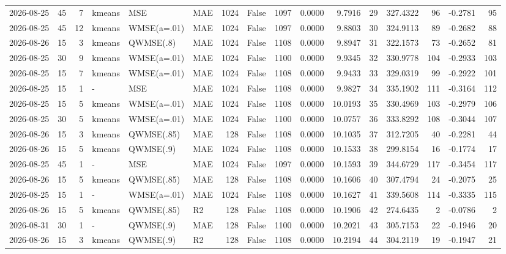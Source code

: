 \documentclass[10pt]{article}
\begin{document}
\begin{landscape}
\begin{longtable}{@{}lrrlllrcrrrrrrrr@{}}
2026-08-25 & 45 & 7 & kmeans & MSE & MAE & 1024 & False & 1097 & 0.0000 & 9.7916 & 29 & 327.4322 & 96 & -0.2781 & 95 \\
2026-08-25 & 45 & 12 & kmeans & WMSE(a=.01) & MAE & 1024 & False & 1097 & 0.0000 & 9.8803 & 30 & 324.9113 & 89 & -0.2682 & 88 \\
2026-08-26 & 15 & 3 & kmeans & QWMSE(.8) & MAE & 1024 & False & 1108 & 0.0000 & 9.8947 & 31 & 322.1573 & 73 & -0.2652 & 81 \\
2026-08-25 & 30 & 9 & kmeans & WMSE(a=.01) & MAE & 1024 & False & 1100 & 0.0000 & 9.9345 & 32 & 330.9778 & 104 & -0.2933 & 103 \\
2026-08-25 & 15 & 7 & kmeans & WMSE(a=.01) & MAE & 1024 & False & 1108 & 0.0000 & 9.9433 & 33 & 329.0319 & 99 & -0.2922 & 101 \\
2026-08-25 & 15 & 1 & - & MSE & MAE & 1024 & False & 1108 & 0.0000 & 9.9827 & 34 & 335.1902 & 111 & -0.3164 & 112 \\
2026-08-25 & 15 & 5 & kmeans & WMSE(a=.01) & MAE & 1024 & False & 1108 & 0.0000 & 10.0193 & 35 & 330.4969 & 103 & -0.2979 & 106 \\
2026-08-25 & 30 & 5 & kmeans & WMSE(a=.01) & MAE & 1024 & False & 1100 & 0.0000 & 10.0757 & 36 & 333.8292 & 108 & -0.3044 & 107 \\
2026-08-26 & 15 & 3 & kmeans & QWMSE(.85) & MAE & 128 & False & 1108 & 0.0000 & 10.1035 & 37 & 312.7205 & 40 & -0.2281 & 44 \\
2026-08-26 & 15 & 5 & kmeans & QWMSE(.9) & MAE & 1024 & False & 1108 & 0.0000 & 10.1533 & 38 & 299.8154 & 16 & -0.1774 & 17 \\
2026-08-25 & 45 & 1 & - & MSE & MAE & 1024 & False & 1097 & 0.0000 & 10.1593 & 39 & 344.6729 & 117 & -0.3454 & 117 \\
2026-08-26 & 15 & 5 & kmeans & QWMSE(.85) & MAE & 128 & False & 1108 & 0.0000 & 10.1606 & 40 & 307.4794 & 24 & -0.2075 & 25 \\
2026-08-25 & 15 & 1 & - & WMSE(a=.01) & MAE & 1024 & False & 1108 & 0.0000 & 10.1627 & 41 & 339.5608 & 114 & -0.3335 & 115 \\
2026-08-26 & 15 & 5 & kmeans & QWMSE(.85) & R2 & 128 & False & 1108 & 0.0000 & 10.1906 & 42 & 274.6435 & 2 & -0.0786 & 2 \\
2026-08-31 & 30 & 1 & - & QWMSE(.9) & MAE & 128 & False & 1100 & 0.0000 & 10.2021 & 43 & 305.7153 & 22 & -0.1946 & 20 \\
2026-08-26 & 15 & 3 & kmeans & QWMSE(.9) & R2 & 128 & False & 1108 & 0.0000 & 10.2194 & 44 & 304.2119 & 19 & -0.1947 & 21 \\

\end{longtable}
\end{landscape}
\end{document}
